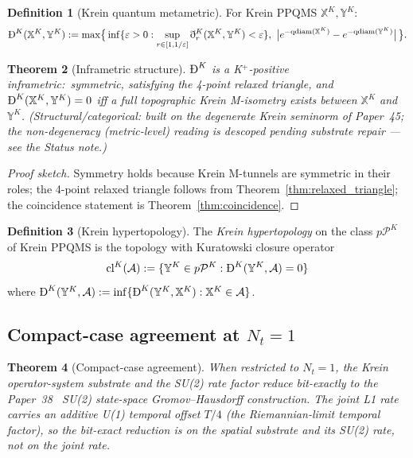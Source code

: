 \documentclass[11pt,a4paper]{article}
\theoremstyle{plain}
\newtheorem{theorem}{Theorem}[section]
\theoremstyle{definition}
\newtheorem{definition}[theorem]{Definition}
\newcommand{\Nt}{N_{t}}
\newcommand{\Dethmet}{\eth^{K}}
\newcommand{\BigDeth}{\text{\DJ}^{K}}
\begin{document}
\begin{definition}[Krein quantum metametric]\label{def:krein_metametric}
For Krein PPQMS $\mathbb{X}^{K}, \mathbb{Y}^{K}$:
\[
\BigDeth(\mathbb{X}^{K}, \mathbb{Y}^{K}) := \max\bigl\{\,
\inf\{\varepsilon > 0 : \sup_{r \in [1, 1/\varepsilon]}
\Dethmet_{r}(\mathbb{X}^{K}, \mathbb{Y}^{K}) < \varepsilon\},\
\bigl|e^{-\mathrm{qdiam}(\mathbb{X}^{K})} -
e^{-\mathrm{qdiam}(\mathbb{Y}^{K})}\bigr|\,\bigr\}.
\]
\end{definition}

\begin{theorem}[Inframetric structure]\label{thm:inframetric}
$\BigDeth$ is a K$^{+}$-positive inframetric:\ symmetric, satisfying
the 4-point relaxed triangle, and $\BigDeth(\mathbb{X}^{K},
\mathbb{Y}^{K}) = 0$ iff a full topographic Krein M-isometry exists
between $\mathbb{X}^{K}$ and $\mathbb{Y}^{K}$.
\emph{(Structural/categorical: built on the degenerate Krein seminorm
of Paper~45; the non-degeneracy (metric-level) reading is descoped
pending substrate repair --- see the Status note.)}
\end{theorem}

\begin{proof}[Proof sketch]
Symmetry holds because Krein M-tunnels are symmetric in their roles;
the 4-point relaxed triangle follows from
Theorem~\ref{thm:relaxed_triangle}; the coincidence statement is
Theorem~\ref{thm:coincidence}.
\end{proof}

\begin{definition}[Krein hypertopology]\label{def:krein_hypertopology}
The \emph{Krein hypertopology} on the class
$p\mathcal{P}^{K}$ of Krein PPQMS is the topology with Kuratowski
closure operator
\[
\mathrm{cl}^{K}(\mathcal{A}) := \{\mathbb{Y}^{K} \in p\mathcal{P}^{K} :
\BigDeth(\mathbb{Y}^{K}, \mathcal{A}) = 0\}
\]
where $\BigDeth(\mathbb{Y}^{K}, \mathcal{A}) :=
\inf\{\BigDeth(\mathbb{Y}^{K}, \mathbb{X}^{K}) : \mathbb{X}^{K}
\in \mathcal{A}\}$.
\end{definition}

\subsection{Compact-case agreement at $\Nt = 1$}\label{sec:compact_case}

\begin{theorem}[Compact-case agreement]\label{thm:compact_agreement}
When restricted to $\Nt = 1$, the Krein operator-system substrate and
the SU(2) rate factor reduce bit-exactly to the Paper~38~\cite{paper38}
SU(2) state-space Gromov--Hausdorff construction. The \emph{joint} L1
rate carries an additive U(1) temporal offset $T/4$ (the Riemannian-limit
temporal factor), so the bit-exact reduction is on the spatial substrate
and its SU(2) rate, not on the joint rate.
\end{theorem}
\end{document}
